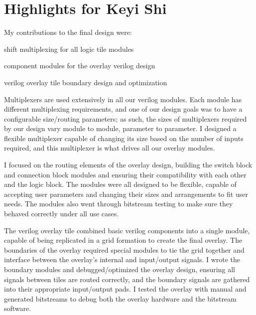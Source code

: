 \section*{Highlights for Keyi Shi}

My contributions to the final design were:
\begin{itemlist}
	\item shift multiplexing for all logic tile modules
	\item component modules for the overlay verilog design
	\item verilog overlay tile boundary design and optimization
\end{itemlist}

Multiplexers are used extensively in all our verilog modules.
Each module has different multiplexing requirements, and one of our design goals was to have a configurable size/routing parameters; as such, the sizes of multiplexers required by our design vary module to module, parameter to parameter.
I designed a flexible multiplexer capable of changing its size based on the number of inputs required, and this multiplexer is what drives all our overlay modules.

I focused on the routing elements of the overlay design, building the switch block and connection block modules and ensuring their compatibility with each other and the logic block.
The modules were all designed to be flexible, capable of accepting user parameters and changing their sizes and arrangements to fit user needs.
The modules also went through bitstream testing to make sure they behaved correctly under all use cases.

The verilog overlay tile combined basic verilog components into a single module, capable of being replicated in a grid formation to create the final overlay.
The boundaries of the overlay required special modules to tie the grid together and interface between the overlay's internal and input/output signals.
I wrote the boundary modules and debugged/optimized the overlay design, ensuring all signals between tiles are routed correctly, and the boundary signals are gathered into their appropriate input/output pads.
I tested the overlay with manual and generated bitstreams to debug both the overlay hardware and the bitstream software.